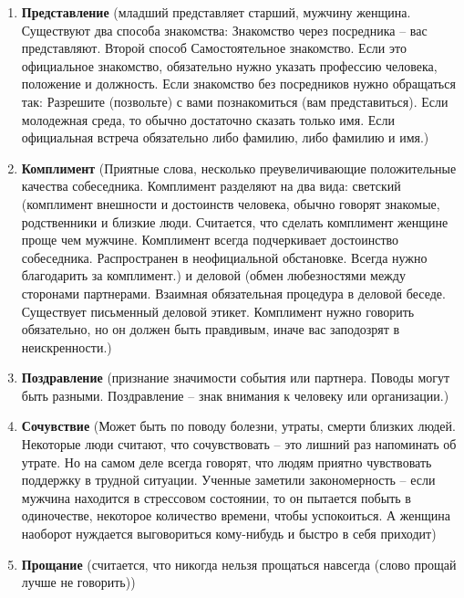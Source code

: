 \documentclass{article}
\begin{document}
\begin{enumerate}
    \item \textbf{Представление} (младший представляет старший, мужчину женщина. Существуют два способа знакомства: Знакомство через посредника – вас представляют. Второй способ Самостоятельное знакомство. Если это официальное знакомство, обязательно нужно указать профессию человека, положение и должность. Если знакомство без посредников нужно обращаться так: Разрешите (позвольте) с вами познакомиться (вам представиться). Если молодежная среда, то обычно достаточно сказать только имя. Если официальная встреча обязательно либо фамилию, либо фамилию и имя.)
    \item \textbf{Комплимент} (Приятные слова, несколько преувеличивающие положительные качества собеседника. Комплимент разделяют на два вида: светский (комплимент внешности и достоинств человека, обычно говорят знакомые, родственники и близкие люди. Считается, что сделать комплимент женщине проще чем мужчине. Комплимент всегда подчеркивает достоинство собеседника. Распространен в неофициальной обстановке. Всегда нужно благодарить за комплимент.) и деловой (обмен любезностями между сторонами партнерами. Взаимная обязательная процедура в деловой беседе. Существует письменный деловой этикет. Комплимент нужно говорить обязательно, но он должен быть правдивым, иначе вас заподозрят в неискренности.)
    \item \textbf{Поздравление} (признание значимости события или партнера. Поводы могут быть разными. Поздравление – знак внимания к человеку или организации.)
    \item \textbf{Сочувствие} (Может быть по поводу болезни, утраты, смерти близких людей. Некоторые люди считают, что сочувствовать – это лишний раз напоминать об утрате. Но на самом деле всегда говорят, что людям приятно чувствовать поддержку в трудной ситуации. Ученные заметили закономерность – если мужчина находится в стрессовом состоянии, то он пытается побыть в одиночестве, некоторое количество времени, чтобы успокоиться. А женщина наоборот нуждается выговориться кому-нибудь и быстро в себя приходит)
    \item \textbf{Прощание} (считается, что никогда нельзя прощаться навсегда (слово прощай лучше не говорить))

\end{enumerate}
\end{document}
